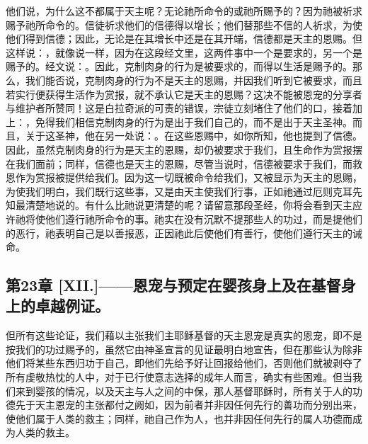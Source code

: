 他们说，为什么这不都属于天主呢？无论祂所命令的或祂所赐予的？因为祂被祈求赐予祂所命令的。信徒祈求他们的信德得以增长；他们替那些不信的人祈求，为使他们得到信德；因此，无论是在其增长中还是在其开端，信德都是天主的恩赐。但这样说：，就像说一样，因为在这段经文里，这两件事中一个是要求的，另一个是赐予的。经文说：。因此，克制肉身的行为是被要求的，而得以生活是赐予的。那么，我们能否说，克制肉身的行为不是天主的恩赐，并因我们听到它被要求，而且若实行便获得生活作为赏报，就不承认它是天主的恩赐？这决不能被恩宠的分享者与维护者所赞同！这是白拉奇派的可责的错误，宗徒立刻堵住了他们的口，接着加上：，免得我们相信克制肉身的行为是出于我们自己的，而不是出于天主圣神。而且，关于这圣神，他在另一处说：。在这些恩赐中，如你所知，他也提到了信德。因此，虽然克制肉身的行为是天主的恩赐，却仍被要求于我们，且生命作为赏报摆在我们面前；同样，信德也是天主的恩赐，尽管当说时，信德被要求于我们，而救恩作为赏报被提供给我们。因为这一切既被命令给我们，又被显示为天主的恩赐，为使我们明白，我们既行这些事，又是由天主使我们行事，正如祂通过厄则克耳先知最清楚地说的。有什么比祂说更清楚的呢？请留意那段圣经，你将会看到天主应许祂将使他们遵行祂所命令的事。祂实在没有沉默不提那些人的功过，而是提他们的恶行，祂表明自己是以善报恶，正因祂此后使他们有善行，使他们遵行天主的诫命。\par


\subsection{第23章 [XII.]——恩宠与预定在婴孩身上及在基督身上的卓越例证。}

但所有这些论证，我们藉以主张我们主耶稣基督的天主恩宠是真实的恩宠，即不是按我们的功过赐予的，虽然它由神圣宣言的见证最明白地宣告，但在那些认为除非他们将某些东西归功于自己，即他们先给予好让回报给他们，否则他们就被剥夺了所有虔敬热忱的人中，对于已行使意志选择的成年人而言，确实有些困难。但当我们来到婴孩的情况，以及天主与人之间的中保，那人基督耶稣时，所有关于人的功德先于天主恩宠的主张都付之阙如，因为前者并非因任何先行的善功而分别出来，使他们属于人类的救主；同样，祂自己作为人，也并非因任何先行的属人功德而成为人类的救主。\par

